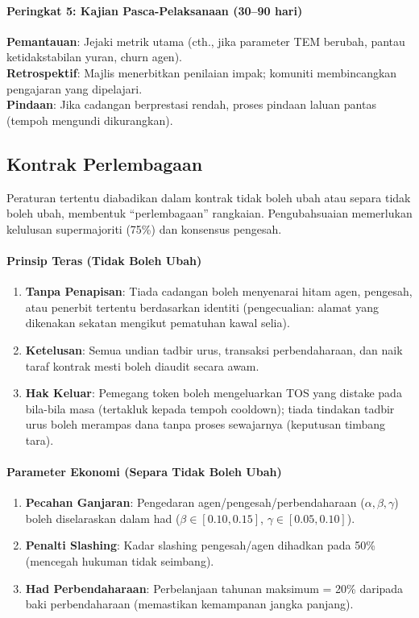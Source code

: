 \documentclass[11pt]{article}
\begin{document}
\paragraph{Peringkat 5: Kajian Pasca-Pelaksanaan (30--90 hari)}
\textbf{Pemantauan}: Jejaki metrik utama (cth., jika parameter TEM berubah, pantau ketidakstabilan yuran, churn agen).\\
\textbf{Retrospektif}: Majlis menerbitkan penilaian impak; komuniti membincangkan pengajaran yang dipelajari.\\
\textbf{Pindaan}: Jika cadangan berprestasi rendah, proses pindaan laluan pantas (tempoh mengundi dikurangkan).

\subsection{Kontrak Perlembagaan}

Peraturan tertentu diabadikan dalam kontrak tidak boleh ubah atau separa tidak boleh ubah, membentuk ``perlembagaan'' rangkaian. Pengubahsuaian memerlukan kelulusan supermajoriti (75\%) dan konsensus pengesah.

\paragraph{Prinsip Teras (Tidak Boleh Ubah)}
\begin{enumerate}[noitemsep]
  \item \textbf{Tanpa Penapisan}: Tiada cadangan boleh menyenarai hitam agen, pengesah, atau penerbit tertentu berdasarkan identiti (pengecualian: alamat yang dikenakan sekatan mengikut pematuhan kawal selia).
  \item \textbf{Ketelusan}: Semua undian tadbir urus, transaksi perbendaharaan, dan naik taraf kontrak mesti boleh diaudit secara awam.
  \item \textbf{Hak Keluar}: Pemegang token boleh mengeluarkan TOS yang distake pada bila-bila masa (tertakluk kepada tempoh cooldown); tiada tindakan tadbir urus boleh merampas dana tanpa proses sewajarnya (keputusan timbang tara).
\end{enumerate}

\paragraph{Parameter Ekonomi (Separa Tidak Boleh Ubah)}
\begin{enumerate}[noitemsep]
  \item \textbf{Pecahan Ganjaran}: Pengedaran agen/pengesah/perbendaharaan ($\alpha, \beta, \gamma$) boleh diselaraskan dalam had ($\beta \in [0.10, 0.15]$, $\gamma \in [0.05, 0.10]$).
  \item \textbf{Penalti Slashing}: Kadar slashing pengesah/agen dihadkan pada 50\% (mencegah hukuman tidak seimbang).
  \item \textbf{Had Perbendaharaan}: Perbelanjaan tahunan maksimum = 20\% daripada baki perbendaharaan (memastikan kemampanan jangka panjang).
\end{enumerate}
\end{document}
